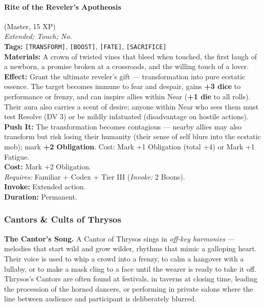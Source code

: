 \paragraph{Rite of the Reveler's Apotheosis} (Master, 15 XP) \hfill \\
\emph{Extended; Touch; No.} \\
\textbf{Tags:} \texttt{[TRANSFORM]}, \texttt{[BOOST]}, \texttt{[FATE]}, \texttt{[SACRIFICE]} \\
\textbf{Materials:} A crown of twisted vines that bleed when touched, the first laugh of a newborn, a promise broken at a crossroads, and the willing touch of a lover. \\
\textbf{Effect:} Grant the ultimate reveler's gift --- transformation into pure ecstatic essence. The target becomes immune to fear and despair, gains \textbf{+3 dice} to performance or frenzy, and can inspire allies within Near (\textbf{+1 die} to all rolls). Their aura also carries a scent of desire; anyone within Near who sees them must test Resolve (DV 3) or be mildly infatuated (disadvantage on hostile actions). \\
\textbf{Push It:} The transformation becomes contagious --- nearby allies may also transform but risk losing their humanity (their sense of self blurs into the ecstatic mob); mark \textbf{+2 Obligation}. Cost: Mark +1 Obligation (total +4) or Mark +1 Fatigue. \\
\textbf{Cost:} Mark +2 Obligation. \\
\textit{Requires:} Familiar + Codex + Tier III (\textit{Invoke:} 2 Boons). \\
\textbf{Invoke:} Extended action. \\
\textbf{Duration:} Permanent.

\subsubsection*{Cantors \& Cults of Thrysos}

\textbf{The Cantor's Song.} A Cantor of Thrysos sings in \textit{off-key harmonies} --- melodies that start wild and grow wilder, rhythms that mimic a galloping heart. Their voice is used to whip a crowd into a frenzy, to calm a hangover with a lullaby, or to make a mask cling to a face until the wearer is ready to take it off. Thrysos's Cantors are often found at festivals, in taverns at closing time, leading the procession of the horned dancers, or performing in private salons where the line between audience and participant is deliberately blurred.

